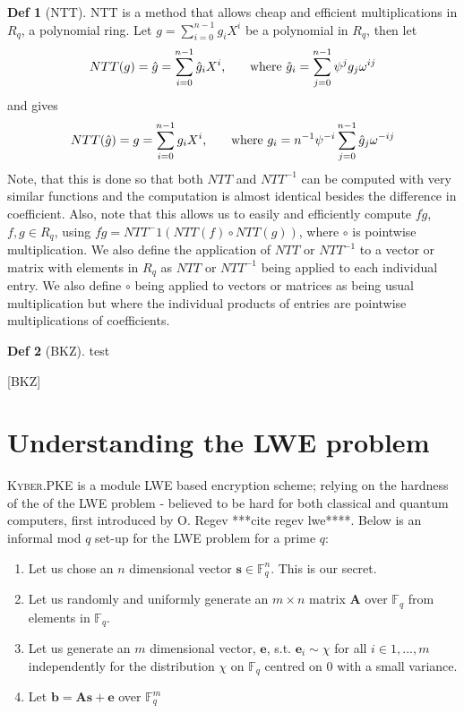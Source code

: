 \documentclass[a4paper, 10pt]{article}
\theoremstyle{definition}
\newtheorem{definition}{Def}[section]
\begin{document}
\begin{definition}[\ac{NTT}]
    \ac{NTT} is a method that allows cheap and efficient multiplications in $R_q$, a polynomial ring. Let $g=\sum_{i=0}^{n-1}g_iX^i$ be a polynomial in $R_q$, then let
    \[NTT(g)=\hat{g}=\sum_{i=0}^{n-1}\hat{g}_iX^i \mbox{,\qquad where } \hat{g}_i = \sum_{j=0}^{n-1}\psi ^jg_j\omega ^{ij}\]
    and gives
    \[NTT(\hat{g})=g=\sum_{i=0}^{n-1}g_iX^i \mbox{,\qquad where } g_i = n^{-1}\psi ^{-i}\sum^{n-1}_{j=0}\hat{g}_j\omega ^{-ij}\]
    Note, that this is done so that both $NTT$ and $NTT^{-1}$ can be computed with very similar functions and the computation is almost identical besides the difference in coefficient. Also, note that this allows us to easily and efficiently compute $f \dot g$, $f,g \in R_q$, using $f \dot g = NTT^-1(NTT(f)\circ NTT(g))$, where $\circ$ is pointwise multiplication. We also define the application of $NTT$ or $NTT^{-1}$ to a vector or matrix with elements in $R_q$ as $NTT$ or $NTT^{-1}$ being applied to each individual entry. We also define $\circ$ being applied to vectors or matrices as being usual multiplication but where the individual products of entries are pointwise multiplications of coefficients.
\end{definition}

\begin{definition}[BKZ]
    test
\end{definition}[BKZ]

\section{Understanding the \ac{LWE} problem}

\textsc{Kyber}.\ac{PKE} is a module \ac{LWE} based encryption scheme; relying on the hardness of the of the \ac{LWE} problem -  believed to be hard for both classical and quantum computers, first introduced by O. Regev ***cite regev lwe****. Below is an informal mod $q$ set-up for the \ac{LWE} problem for a prime $q$:

\begin{enumerate}
    \item Let us chose an $n$ dimensional vector $\mathbf{s} \in \mathbb{F}^n_q$. This is our secret.
    \item Let us randomly and uniformly generate an $m\times n$ matrix $\mathbf{A} $ over $\mathbb{F}_q$ from elements in $\mathbb{F} _q$.
    \item Let us generate an $m$ dimensional vector, $\mathbf{e}$, s.t. $\mathbf{e}_i\sim \chi$ for all $i \in {1,...,m}$ independently for the distribution $\chi$ on $\mathbb{F}_q$ centred on $0$ with a small variance.
    \item Let $\mathbf{b} = \mathbf{A}\mathbf{s}+\mathbf{e}$ over $\mathbb{F}_q^m$
\end{enumerate}
\end{document}
